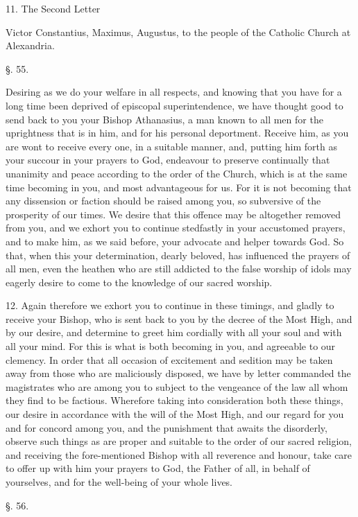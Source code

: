 11. The Second Letter

Victor Constantius, Maximus, Augustus, to the
people of the Catholic Church at Alexandria.

§. 55.

Desiring as we do your welfare in all respects,
and knowing that you have for a long time been deprived of episcopal
superintendence, we have thought good to send back to you your Bishop
Athanasius, a man known to all men for the uprightness that is in him,
and for his personal deportment. Receive him, as you are wont to
receive every one, in a suitable manner, and, putting him forth as
your succour in your prayers to God, endeavour to preserve continually
that unanimity and peace according to the order of the Church, which
is at the same time becoming in you, and most advantageous for us. For
it is not becoming that any dissension or faction should be raised
among you, so subversive of the prosperity of our times. We desire
that this offence may be altogether removed from you, and we exhort
you to continue stedfastly in your accustomed prayers, and to make
him, as we said before, your advocate and helper towards God. So that,
when this your determination, dearly beloved, has influenced the
prayers of all men, even the heathen who are still addicted to the
false worship of idols may eagerly desire to come to the knowledge of
our sacred worship.

12. Again therefore we exhort you to continue in
these timings, and gladly to receive your Bishop, who is sent back to
you by the decree of the Most High, and by our desire, and determine
to greet him cordially with all your soul and with all your mind. For
this is what is both becoming in you, and agreeable to our clemency.
In order that all occasion of excitement and sedition may be taken
away from those who are maliciously disposed, we have by letter
commanded the magistrates who are among you to subject to the
vengeance of the law all whom they find to be factious. Wherefore
taking into consideration both these things, our desire in accordance
with the will of the Most High, and our regard for you and for concord
among you, and the punishment that awaits the disorderly, observe such
things as are proper and suitable to the order of our sacred religion,
and receiving the fore-mentioned Bishop with all reverence and honour,
take care to offer up with him your prayers to God, the Father of all,
in behalf of yourselves, and for the well-being of your whole lives.

§. 56.

